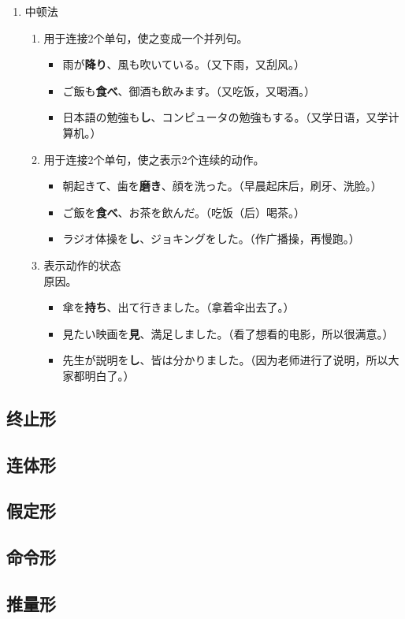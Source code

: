 \begin{enumerate}[A]
\begin{enumerate}[a]
    \end{enumerate}

    \item 中顿法
    \begin{enumerate}[a]
        \item 用于连接2个单句，使之变成一个并列句。
        \begin{itemize}
            \item {\jp 雨が{\bfseries 降り}、風も吹いている。}（又下雨，又刮风。）
            \item {\jp ご飯も{\bfseries 食べ}、御酒も飲みます。}（又吃饭，又喝酒。）
            \item {\jp 日本語の勉強も{\bfseries し}、コンピュータの勉強もする。}（又学日语，又学计算机。）
        \end{itemize}
        \item 用于连接2个单句，使之表示2个连续的动作。
        \begin{itemize}
            \item {\jp 朝起きて、歯を{\bfseries 磨き}、顔を洗った。}（早晨起床后，刷牙、洗脸。）
            \item {\jp ご飯を{\bfseries 食べ}、お茶を飲んだ。}（吃饭（后）喝茶。）
            \item {\jp ラジオ体操を{\bfseries し}、ジョキングをした。}（作广播操，再慢跑。）
        \end{itemize}
        \item 表示动作的状态\\原因。
        \begin{itemize}
            \item {\jp 傘を{\bfseries 持ち}、出て行きました。}（拿着伞出去了。）
            \item {\jp 見たい映画を{\bfseries 見}、満足しました。}（看了想看的电影，所以很满意。）
            \item {\jp 先生が説明を{\bfseries し}、皆は分かりました。}（因为老师进行了说明，所以大家都明白了。）
        \end{itemize}
        
    \end{enumerate}
\end{enumerate}
\subsection{终止形}

\subsection{连体形}

\subsection{假定形}

\subsection{命令形}

\subsection{推量形}



